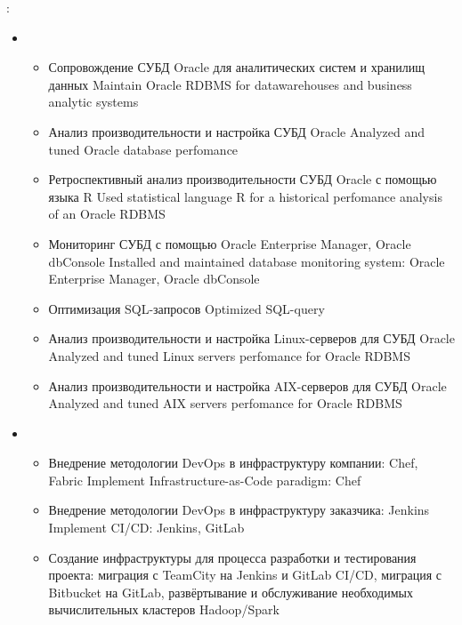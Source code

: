 \documentclass[11pt,a4paper,sans]{moderncv}        %
\begin{document}
{\protect{}}
{}
{}
{
	\achievements:
	\begin{itemize}
		\item {}
		\begin{itemize}
			\item {}
				{Сопровождение СУБД Oracle для аналитических систем и хранилищ данных}
				{Maintain Oracle RDBMS for datawarehouses and business analytic systems}
			\item {}
				{Анализ производительности и настройка СУБД Oracle}
				{Analyzed and tuned Oracle database perfomance}
			\item {}
				{Ретроспективный анализ производительности СУБД Oracle с помощью языка R}
				{Used statistical language R for a historical perfomance analysis of an Oracle RDBMS}
			\item {}
				{Мониторинг СУБД с помощью Oracle Enterprise Manager, Oracle dbConsole}
				{Installed and maintained database monitoring system: Oracle Enterprise Manager, Oracle dbConsole}
			\item {}
				{Оптимизация SQL-запросов}
				{Optimized SQL-query}
			\item {}
				{Анализ производительности и настройка Linux-серверов для СУБД Oracle}
				{Analyzed and tuned Linux servers perfomance for Oracle RDBMS}
			\item {}
				{Анализ производительности и настройка AIX-серверов для СУБД Oracle}
				{Analyzed and tuned AIX servers perfomance for Oracle RDBMS}
		\end{itemize}
		\item {}
		\begin{itemize}
			\item {}
				{Внедрение методологии DevOps в инфраструктуру компании: Chef, Fabric}
				{Implement Infrastructure-as-Code paradigm: Chef}
			\item {}
				{Внедрение методологии DevOps в инфраструктуру заказчика: Jenkins}
				{Implement CI/CD: Jenkins, GitLab}
			\item {}
				{Создание инфраструктуры для процесса разработки и тестирования проекта: миграция с TeamCity на Jenkins и GitLab CI/CD, миграция с Bitbucket на GitLab, развёртывание и обслуживание необходимых вычислительных кластеров Hadoop/Spark}

\end{itemize}
\end{itemize}}
\end{document}
